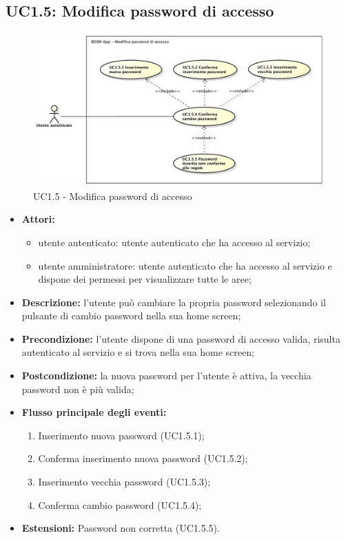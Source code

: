 \pagebreak


\subsection{UC1.5: Modifica password di accesso}

\begin{figure}[!htbp]
    \centering
    \centerline{\includegraphics[scale=0.4]{./images/UC1_5.pdf}}
    \caption{UC1.5 - Modifica password di accesso}
\end{figure}

\begin{itemize}
   	\item \textbf{Attori:}
    \begin{itemize}
    	\item utente autenticato: utente autenticato che ha accesso al servizio;
    	\item utente amministratore: utente autenticato che ha accesso al servizio e dispone dei permessi per visualizzare tutte le aree;
	\end{itemize}
	  \item \textbf{Descrizione:} l'utente può cambiare la propria password selezionando il pulsante di cambio password nella sua home screen;
    \item \textbf{Precondizione:} l'utente dispone di una password di accesso valida, risulta autenticato al servizio e si trova nella sua home screen;
    \item \textbf{Postcondizione:} la nuova password per l'utente è attiva, la vecchia password non è più valida;
	\item \textbf{Flusso principale degli eventi:}
    \begin{enumerate}
        \item Inserimento nuova password (UC1.5.1);
        \item Conferma inserimento nuova password (UC1.5.2);
        \item Inserimento vecchia password (UC1.5.3);
        \item Conferma cambio password (UC1.5.4);
    \end{enumerate}
   	\item \textbf{Estensioni:} Password non corretta (UC1.5.5).

\end{itemize}

